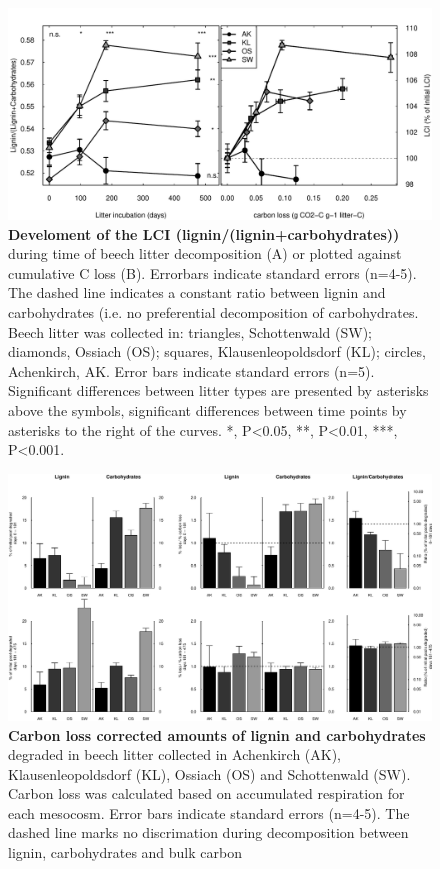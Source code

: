 \documentclass[10pt]{article}
\begin{document}
\begin{flushleft}
\newpage
\begin{figure}[!ht]
\begin{center}
\includegraphics{ligpaper-lci}
\end{center}
\caption{
{\bf Develoment of the LCI (lignin/(lignin+carbohydrates))} during time of beech litter decomposition (A) or plotted against cumulative C loss (B). Errorbars indicate standard errors (n=4-5). The dashed line indicates a constant ratio between lignin and carbohydrates (i.e. no preferential decomposition of carbohydrates. Beech litter was collected in: triangles, Schottenwald (SW); diamonds, Ossiach (OS); squares, Klausenleopoldsdorf (KL); circles, Achenkirch, AK. Error bars indicate standard errors (n=5). Significant differences between litter types are presented by asterisks above the symbols, significant differences between time points by asterisks to the right of the curves. *, P\textless 0.05, **, P\textless 0.01, ***, P\textless 0.001.}
\label{fig:lci}
\end{figure}


\newpage
\begin{figure}[h!]
\vspace*{2mm}
\begin{center}
\includegraphics{ligpaper-degrdiff}
\end{center}
\caption{
{\bf Carbon loss corrected amounts of lignin and carbohydrates} degraded in beech litter collected in Achenkirch (AK), Klausenleopoldsdorf (KL), Ossiach (OS) and Schottenwald (SW). Carbon loss was calculated based on accumulated respiration for each mesocosm. Error bars indicate standard errors (n=4-5). The dashed line marks no discrimation during decomposition between lignin, carbohydrates and bulk carbon}
\label{fig:degr}
\end{figure}


\end{flushleft}
\end{document}
